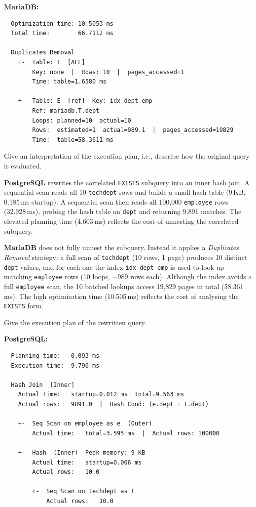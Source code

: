 \documentclass[11pt]{scrartcl}
\begin{document}
\textbf{MariaDB:}

{\small
\parskip0pt\begin{verbatim}
  Optimization time: 10.5053 ms
  Total time:        66.7112 ms

  Duplicates Removal
    +-  Table: T  [ALL]
        Key: none  |  Rows: 10  |  pages_accessed=1
        Time: table=1.6580 ms

    +-  Table: E  [ref]  Key: idx_dept_emp
        Ref: mariadb.T.dept
        Loops: planned=10  actual=10
        Rows:  estimated=1  actual=989.1  |  pages_accessed=19829
        Time:  table=58.3611 ms
\end{verbatim}}

Give an interpretation of the execution plan, i.e., describe how the original query is evaluated.

\textbf{PostgreSQL} rewrites the correlated \texttt{EXISTS} subquery into an inner hash join. A sequential scan reads all 10 \texttt{techdept} rows and builds a small hash table (9\,KB, 0.185\,ms startup). A sequential scan then reads all 100,000 \texttt{employee} rows (32.928\,ms), probing the hash table on \texttt{dept} and returning 9,891 matches. The elevated planning time (4.603\,ms) reflects the cost of unnesting the correlated subquery.

\textbf{MariaDB} does not fully unnest the subquery. Instead it applies a \textit{Duplicates Removal} strategy: a full scan of \texttt{techdept} (10 rows, 1 page) produces 10 distinct \texttt{dept} values, and for each one the index \texttt{idx\_dept\_emp} is used to look up matching \texttt{employee} rows (10 loops, $\sim$989 rows each). Although the index avoids a full \texttt{employee} scan, the 10 batched lookups access 19,829 pages in total (58.361\,ms). The high optimisation time (10.505\,ms) reflects the cost of analysing the \texttt{EXISTS} form.

Give the execution plan of the rewritten query.

\textbf{PostgreSQL:}

{\small
\parskip0pt\begin{verbatim}
  Planning time:   0.093 ms
  Execution time:  9.796 ms

  Hash Join  [Inner]
    Actual time:   startup=0.012 ms  total=9.563 ms
    Actual rows:   9891.0  |  Hash Cond: (e.dept = t.dept)

    +-  Seq Scan on employee as e  (Outer)
        Actual time:   total=3.595 ms  |  Actual rows: 100000

    +-  Hash  (Inner)  Peak memory: 9 KB
        Actual time:   startup=0.006 ms
        Actual rows:   10.0

        +-  Seq Scan on techdept as t
            Actual rows:   10.0
\end{verbatim}}
\end{document}
